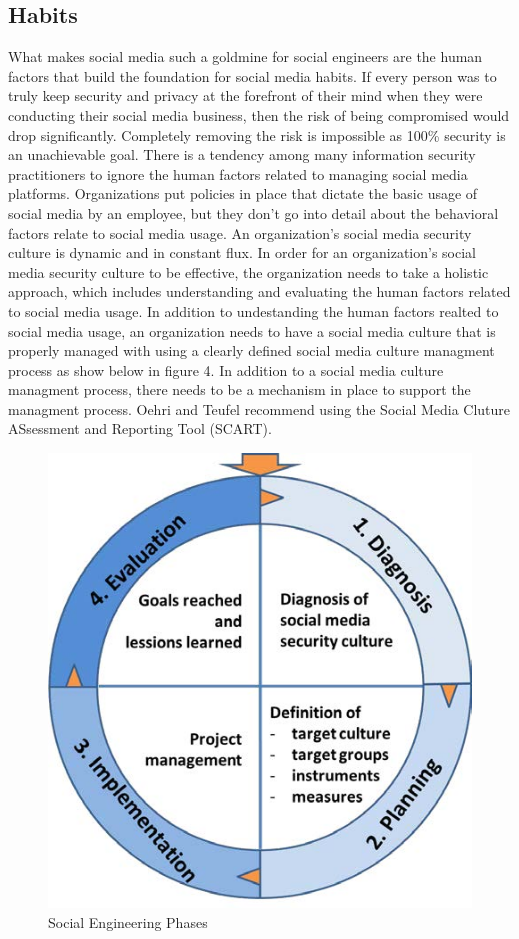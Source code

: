 \documentclass[conference]{IEEEtran}
\begin{document}
\subsection{Habits}
What makes social media such a goldmine for social engineers are the human factors that build the foundation for social media habits.  If every person was to truly keep security and privacy at the forefront of their mind when they were conducting their social media business, then the risk of being compromised would drop significantly.  Completely removing the risk is impossible as 100\% security is an unachievable goal\cite{6320436}. There is a tendency among many information security practitioners to ignore the human factors related to managing social media platforms\cite{6320436}. Organizations put policies in place that dictate the basic usage of social media by an employee, but they don't go into detail about the behavioral factors relate to social media usage.  An organization's social media security culture is dynamic and in constant flux\cite{6320436}.  In order for an organization's social media security culture to be effective, the organization needs to take a holistic approach, which includes understanding and evaluating the human factors related to social media usage. In addition to undestanding the human factors realted to social media usage, an organization needs to have a social media culture that is properly managed with using a clearly defined social media culture managment process as show below in figure 4.   In addition to a social media culture managment process, there needs to be a mechanism in place to support the managment process.  Oehri and Teufel recommend using the Social Media Cluture ASsessment and Reporting Tool (SCART)\cite{teufel}.  
\begin{figure}[htbp]
\centerline{\includegraphics[scale= .75]{SMSC}}
\caption{Social Engineering Phases \cite{6320436} }
\label{fig}
\end{figure}
\end{document}
